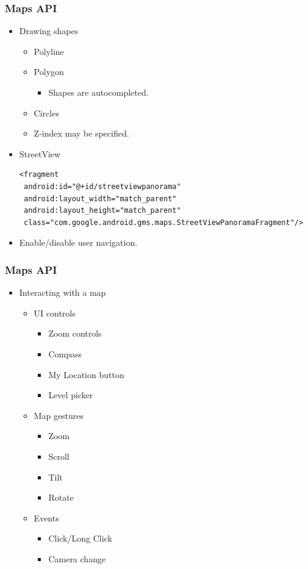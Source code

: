 \documentclass[10pt,xcolor=pdflatex]{beamer}
\begin{document}
\begin{frame}[fragile]\frametitle{Maps API}
\begin{itemize}
	\item Drawing shapes
	  \begin{itemize}
		\item Polyline
		\item Polygon
          \begin{itemize}
            \item Shapes are autocompleted.
          \end{itemize}
    	\item Circles
		\item Z-index may be specified.
      \end{itemize}
    \item StreetView
\lstset{language=Java, basicstyle=\footnotesize\ttfamily}
\begin{lstlisting}
<fragment
 android:id="@+id/streetviewpanorama"
 android:layout_width="match_parent"
 android:layout_height="match_parent"
 class="com.google.android.gms.maps.StreetViewPanoramaFragment"/>
\end{lstlisting}
\item Enable/disable user navigation.
\end{itemize}
\end{frame}

\begin{frame}[fragile]\frametitle{Maps API}
\begin{itemize}
	\item Interacting with a map
	  \begin{itemize}
		\item UI controls
        \begin{itemize}
          \item Zoom controls
          \item Compass
	      \item My Location button
	      \item Level picker
        \end{itemize}
    	\item Map gestures
          \begin{itemize}
            \item Zoom
	        \item Scroll
	        \item Tilt
	        \item Rotate
          \end{itemize}
    	\item Events
          \begin{itemize}
            \item Click/Long Click
	        \item Camera change 
          \end{itemize}
      \end{itemize}
\end{itemize}
\end{frame}
\end{document}
